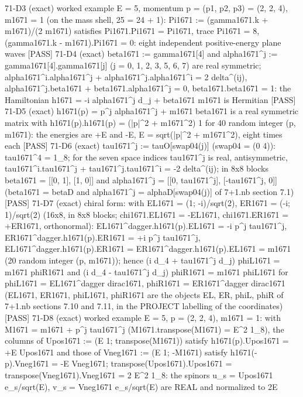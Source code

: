 \documentclass[
  10pt,
]{article}
\newenvironment{Shaded}{}{}
\newcommand{\NormalTok}[1]{#1}
\begin{document}
\begin{Shaded}
\begin{Highlighting}[]
\NormalTok{[PASS] 71{-}D3  (exact) worked example E = 5, momentum p = (p1, p2, p3) = (2, 2, 4), m1671 = 1 (on the mass shell, 25 = 24 + 1): Pi1671 := (gamma1671.k + m1671)/(2 m1671) satisfies Pi1671.Pi1671 = Pi1671, trace Pi1671 = 8, (gamma1671.k {-} m1671).Pi1671 = 0: eight independent positive{-}energy plane waves}
\NormalTok{[PASS] 71{-}D4  (exact) beta1671 := gamma1671[4] and alpha1671\^{}j := gamma1671[4].gamma1671[j] (j = 0, 1, 2, 3, 5, 6, 7) are real symmetric; alpha1671\^{}i.alpha1671\^{}j + alpha1671\^{}j.alpha1671\^{}i = 2 delta\^{}(ij), alpha1671\^{}j.beta1671 + beta1671.alpha1671\^{}j = 0, beta1671.beta1671 = 1: the Hamiltonian h1671 = {-}i alpha1671\^{}j d\_j + beta1671 m1671 is Hermitian}
\NormalTok{[PASS] 71{-}D5  (exact) h1671(p) = p\^{}j alpha1671\^{}j + m1671 beta1671 is a real symmetric matrix with h1671(p).h1671(p) = (|p|\^{}2 + m1671\^{}2) 1 for 40 random integer (p, m1671): the energies are +E and {-}E, E = sqrt(|p|\^{}2 + m1671\^{}2), eight times each}
\NormalTok{[PASS] 71{-}D6  (exact) tau1671\^{}j := tauO[swap04(j)] (swap04 = (0 4)): tau1671\^{}4 = 1\_8; for the seven space indices tau1671\^{}j is real, antisymmetric, tau1671\^{}i.tau1671\^{}j + tau1671\^{}j.tau1671\^{}i = {-}2 delta\^{}(ij); in 8x8 blocks beta1671 = [[0, 1], [1, 0]] and alpha1671\^{}j = [[0, tau1671\^{}j], [{-}tau1671\^{}j, 0]] (beta1671 = betaD and alpha1671\^{}j = alphaD[swap04(j)] of 7+1.nb section 7.1)}
\NormalTok{[PASS] 71{-}D7  (exact) chiral form: with EL1671 = (1; {-}i)/sqrt(2), ER1671 = ({-}i; 1)/sqrt(2) (16x8, in 8x8 blocks; chi1671.EL1671 = {-}EL1671, chi1671.ER1671 = +ER1671, orthonormal): EL1671\^{}dagger.h1671(p).EL1671 = {-}i p\^{}j tau1671\^{}j, ER1671\^{}dagger.h1671(p).ER1671 = +i p\^{}j tau1671\^{}j, EL1671\^{}dagger.h1671(p).ER1671 = ER1671\^{}dagger.h1671(p).EL1671 = m1671 (20 random integer (p, m1671)); hence (i d\_4 + tau1671\^{}j d\_j) phiL1671 = m1671 phiR1671 and (i d\_4 {-} tau1671\^{}j d\_j) phiR1671 = m1671 phiL1671 for phiL1671 = EL1671\^{}dagger dirac1671, phiR1671 = ER1671\^{}dagger dirac1671 (EL1671, ER1671, phiL1671, phiR1671 are the objects EL, ER, phiL, phiR of 7+1.nb sections 7.10 and 7.11, in the PROJECT labelling of the coordinates)}
\NormalTok{[PASS] 71{-}D8  (exact) worked example E = 5, p = (2, 2, 4), m1671 = 1: with M1671 = m1671 + p\^{}j tau1671\^{}j (M1671.transpose(M1671) = E\^{}2 1\_8), the columns of Upos1671 := (E 1; transpose(M1671)) satisfy h1671(p).Upos1671 = +E Upos1671 and those of Vneg1671 := (E 1; {-}M1671) satisfy h1671({-}p).Vneg1671 = {-}E Vneg1671; transpose(Upos1671).Upos1671 = transpose(Vneg1671).Vneg1671 = 2 E\^{}2 1\_8: the spinors u\_s = Upos1671 e\_s/sqrt(E), v\_s = Vneg1671 e\_s/sqrt(E) are REAL and normalized to 2E}

\end{Highlighting}
\end{Shaded}
\end{document}
